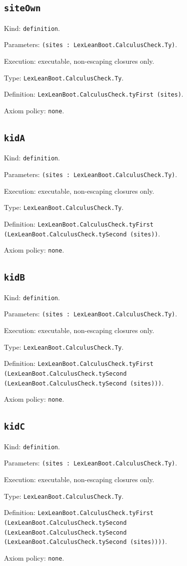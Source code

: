 \documentclass[11pt]{article}
\begin{document}
\subsection*{\texttt{siteOwn}}
\noindent Kind: \texttt{definition}.\par
\noindent Parameters: \texttt{(sites : LexLeanBoot.CalculusCheck.Ty)}.\par
\noindent Execution: executable, non-escaping closures only.\par
\noindent Type: \texttt{LexLeanBoot.CalculusCheck.Ty}.\par
\noindent Definition: \texttt{LexLeanBoot.CalculusCheck.tyFirst (sites)}.\par
\noindent Axiom policy: \texttt{none}.\par
\subsection*{\texttt{kidA}}
\noindent Kind: \texttt{definition}.\par
\noindent Parameters: \texttt{(sites : LexLeanBoot.CalculusCheck.Ty)}.\par
\noindent Execution: executable, non-escaping closures only.\par
\noindent Type: \texttt{LexLeanBoot.CalculusCheck.Ty}.\par
\noindent Definition: \texttt{LexLeanBoot.CalculusCheck.tyFirst (LexLeanBoot.CalculusCheck.tySecond (sites))}.\par
\noindent Axiom policy: \texttt{none}.\par
\subsection*{\texttt{kidB}}
\noindent Kind: \texttt{definition}.\par
\noindent Parameters: \texttt{(sites : LexLeanBoot.CalculusCheck.Ty)}.\par
\noindent Execution: executable, non-escaping closures only.\par
\noindent Type: \texttt{LexLeanBoot.CalculusCheck.Ty}.\par
\noindent Definition: \texttt{LexLeanBoot.CalculusCheck.tyFirst (LexLeanBoot.CalculusCheck.tySecond (LexLeanBoot.CalculusCheck.tySecond (sites)))}.\par
\noindent Axiom policy: \texttt{none}.\par
\subsection*{\texttt{kidC}}
\noindent Kind: \texttt{definition}.\par
\noindent Parameters: \texttt{(sites : LexLeanBoot.CalculusCheck.Ty)}.\par
\noindent Execution: executable, non-escaping closures only.\par
\noindent Type: \texttt{LexLeanBoot.CalculusCheck.Ty}.\par
\noindent Definition: \texttt{LexLeanBoot.CalculusCheck.tyFirst (LexLeanBoot.CalculusCheck.tySecond (LexLeanBoot.CalculusCheck.tySecond (LexLeanBoot.CalculusCheck.tySecond (sites))))}.\par
\noindent Axiom policy: \texttt{none}.\par
\end{document}
